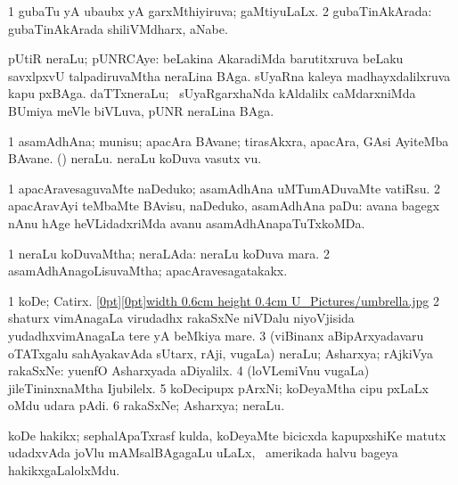 {\bentry
{} 
\gl{\gu}
\expl{}
\bmng
\bnum
\num{1} gubaTu yA ubaubx yA garxMthiyiruva; gaMtiyuLaLx. 
\num{2} gubaTinAkArada:  gubaTinAkArada shiliVMdharx, aNabe. 
\enum
\emng
\eentry

\bentry
{} 
\gl{\nA}
\expl{}
\bmng
pUtiR neraLu; pUNRCAye: 
\banum
{} beLakina AkaradiMda barutitxruva beLaku savxlpxvU talpadiruvaMtha neraLina BAga. 
 sUyaRna kaleya madhayxdalilxruva kapu pxBAga. 
 daTTxneraLu; \sA\ sUyaRgarxhaNda kAldalilx caMdarxniMda BUmiya meVle biVLuva, pUNR neraLina BAga. 
\eanum
\emng
\eentry

\bentry
{} 
\gl{\nA}
\bmng
\bnum
\num{1} asamAdhAna; munisu; apacAra BAvane; tirasAkxra, apacAra, GAsi AyiteMba BAvane. 
 (\pArxparx) 
\banum
{} neraLu. 
 neraLu koDuva vasutx \mo vu. 
\eanum
\numie
\enum
\emng

\noindent 
\gl{\pagu}
\expl{}
\bmng
\bnum
\num{1}  apacAravesaguvaMte naDeduko; asamAdhAna uMTumADuvaMte vatiRsu. 
\num{2}  apacAravAyi teMbaMte BAvisu, naDeduko, asamAdhAna paDu:  avana bagegx nAnu hAge heVLidadxriMda avanu asamAdhAnapaTuTxkoMDa. 
\enum
\emng
\eentry

\bentry
{} 
\gl{\gu}
\expl{}
\bmng
\bnum
\num{1} neraLu koDuvaMtha; neraLAda:  neraLu koDuva mara. 
\num{2} asamAdhAnagoLisuvaMtha; apacAravesagatakakx. 
\enum
\emng
\eentry

\bentry
{} 
\gl{\nA}
\bmng
\bnum
\num{1} koDe; Catirx. \quad\hyperlink{umbrellafigure}{\raisebox{-0.15cm}[0pt][0pt]{\pdfimage width 0.6cm height 0.4cm {U_Pictures/umbrella.jpg}}} 
\num{2} shaturx vimAnagaLa virudadhx rakaSxNe niVDalu niyoVjisida yudadhxvimAnagaLa tere yA beMkiya mare. 
\num{3} (viBinanx aBipArxyadavaru oTATxgalu sahAyakavAda sUtarx, rAji, \mo vugaLa) neraLu; Asharxya; rAjkiVya rakaSxNe:  yuenfO Asharxyada aDiyalilx. 
\num{4} (loVLemiVnu \mo vugaLa) jileTininxnaMtha Ijubilelx. 
\hypertarget{umbrella(5)}{} 
\num{5} koDecipupx pArxNi; koDeyaMtha cipu pxLaLx oMdu udara pAdi. 
\num{6} rakaSxNe; Asharxya; neraLu. 
\enum
\emng
\eentry

\bentry
{}
\gl{\nA}
\expl{}
\bmng
koDe hakikx; sephalApaTxrasf kulda, koDeyaMte bicicxda kapupxshiKe matutx udadxvAda joVlu mAMsalBAgagaLu uLaLx, \da\ amerikada halvu bageya hakikxgaLalolxMdu. 
\emng
\eentry

}
